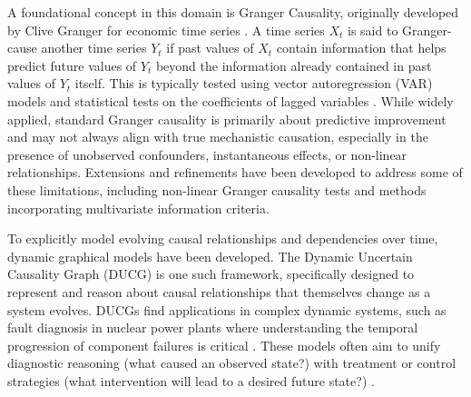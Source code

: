 {{A foundational concept in this domain is Granger Causality, originally developed by Clive Granger for economic time series \cite{Granger1969Investigating, granger1980testing}. A time series $X_t$ is said to Granger-cause another time series $Y_t$ if past values of $X_t$ contain information that helps predict future values of $Y_t$ beyond the information already contained in past values of $Y_t$ itself. This is typically tested using vector autoregression (VAR) models and statistical tests on the coefficients of lagged variables \cite{geweke1982measurement, padav2021granger}. While widely applied, standard Granger causality is primarily about predictive improvement and may not always align with true mechanistic causation, especially in the presence of unobserved confounders, instantaneous effects, or non-linear relationships. Extensions and refinements have been developed to address some of these limitations, including non-linear Granger causality tests and methods incorporating multivariate information criteria.

To explicitly model evolving causal relationships and dependencies over time, dynamic graphical models have been developed. The Dynamic Uncertain Causality Graph (DUCG) \cite{Zhang2012Dynamic} is one such framework, specifically designed to represent and reason about causal relationships that themselves change as a system evolves. DUCGs find applications in complex dynamic systems, such as fault diagnosis in nuclear power plants where understanding the temporal progression of component failures is critical \cite{Deng2018Cubic, Hu2017Accident}. These models often aim to unify diagnostic reasoning (what caused an observed state?) with treatment or control strategies (what intervention will lead to a desired future state?) \cite{Deng2020Towards}.

}}
